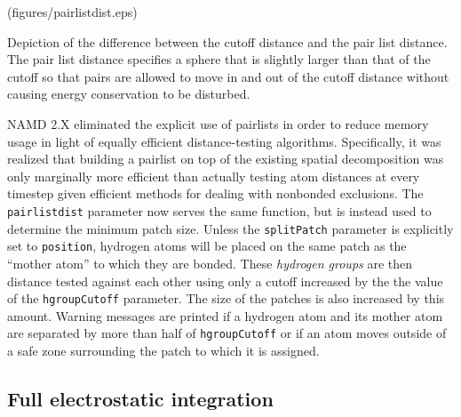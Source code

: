 \displayepsf[htb] (figures/pairlistdist.eps) {
  \caption[Example of cutoff and pairlist distance uses]
  {{\small Depiction of the difference between the cutoff distance and the
  pair list distance.  The pair list distance specifies a sphere that is
  slightly larger than that of the cutoff so that pairs are allowed to
  move in and out of the cutoff distance without causing energy conservation
  to be disturbed.}}
  \label{fig:pairlistdist}
}

NAMD 2.X eliminated the explicit use of pairlists in order to reduce memory usage in light of equally efficient distance-testing algorithms.
Specifically, it was realized that building a pairlist on top of the existing spatial decomposition was only marginally more efficient than actually testing atom distances at every timestep given efficient methods for dealing with nonbonded exclusions.
The \verb!pairlistdist! parameter now serves the same function, but is instead used to determine the minimum patch size.
Unless the \verb!splitPatch! parameter is explicitly set to \verb!position!, hydrogen atoms will be placed on the same patch as the ``mother atom'' to which they are bonded.
These {\em hydrogen groups} are then distance tested against each other using only a cutoff increased by the the value of the \verb!hgroupCutoff! parameter.
The size of the patches is also increased by this amount.
Warning messages are printed if a hydrogen atom and its mother atom are separated by more than half of \verb!hgroupCutoff! or if an atom moves outside of a safe zone surrounding the patch to which it is assigned.

\subsection{Full electrostatic integration}
\label{section:fmadesc}

